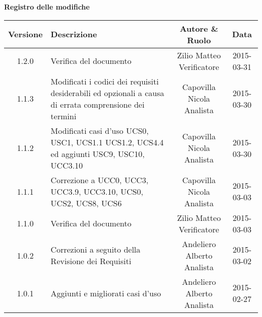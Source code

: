 \begin{center}
\Large{\textbf{Registro delle modifiche}}
\\\vspace{0.5cm}
\normalsize
\begin{tabularx}{\textwidth}{cXcc}
\textbf{Versione} & \textbf{Descrizione} & \textbf{Autore \& Ruolo} & \textbf{Data} \\
\toprule

1.2.0 & Verifica del documento & \multicell{Zilio Matteo \\ Verificatore} & 2015-03-31 \\\midrule
1.1.3 & Modificati i codici dei requisiti desiderabili ed opzionali a causa di errata comprensione dei termini & \multicell{Capovilla Nicola \\ Analista} & 2015-03-30 \\\midrule
1.1.2 & Modificati casi d'uso UCS0, USC1, UCS1.1 UCS1.2, UCS4.4 ed aggiunti USC9, USC10, UCC3.10 & \multicell{Capovilla Nicola \\ Analista} & 2015-03-30 \\\midrule
1.1.1 & Correzione a UCC0, UCC3, UCC3.9, UCC3.10, UCS0, UCS2, UCS8, UCS6 & \multicell{Capovilla Nicola \\ Analista} & 2015-03-03 \\\midrule
1.1.0 & Verifica del documento & \multicell{Zilio Matteo \\ Verificatore} & 2015-03-03 \\\midrule
1.0.2 & Correzioni a seguito della Revisione dei Requisiti & \multicell{Andeliero Alberto \\ Analista} & 2015-03-02  \\\midrule
1.0.1 & Aggiunti e migliorati casi d'uso & \multicell{Andeliero Alberto \\ Analista} &  2015-02-27 \\\midrule

\end{tabularx}
\end{center}
